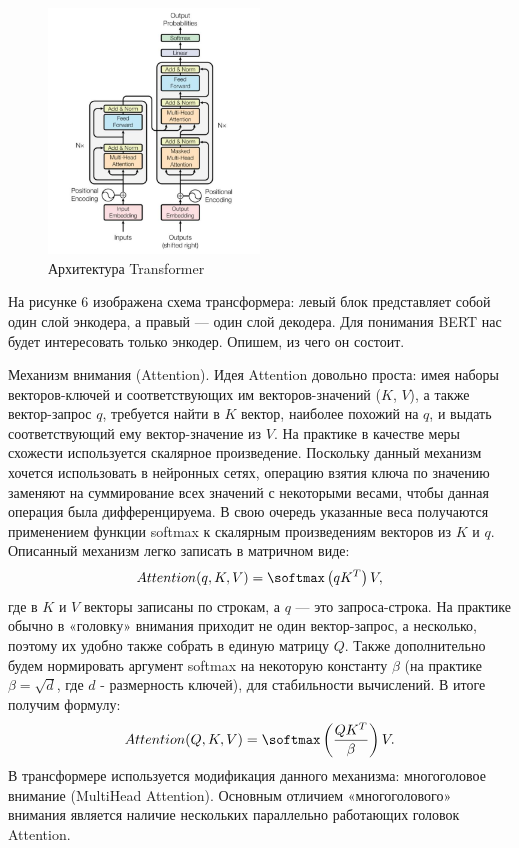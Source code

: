 \documentclass[12pt,a4paper]{article}
\begin{document}
\begin{figure}[H]
\begin{center}
  \includegraphics[width=0.5\textwidth]{transformer.jpg}
  \caption{Архитектура Transformer}
\end{center}
\end{figure}

\noindent На рисунке 6 изображена схема трансформера: левый блок представляет собой один слой энкодера, а правый --- один слой декодера. Для понимания BERT нас будет интересовать только энкодер. Опишем, из чего он состоит.

Механизм внимания (Attention). Идея Attention довольно проста: имея наборы векторов-ключей и соответствующих им векторов-значений ($K$, $V$), а также вектор-запрос $q$, требуется найти в $K$ вектор, наиболее похожий на $q$, и выдать соответствующий ему вектор-значение из $V$. На практике в качестве меры схожести используется скалярное произведение. Поскольку данный механизм хочется использовать в нейронных сетях, операцию взятия ключа по значению заменяют на суммирование всех значений с некоторыми весами, чтобы данная операция была дифференцируема. В свою очередь указанные веса получаются применением функции softmax к скалярным произведениям векторов из $K$ и $q$. Описанный механизм легко записать в матричном виде:$$Attention(q, K, V) = \softmax \left(qK^T \right) V,$$
где в $K$ и $V$ векторы записаны по строкам, а $q$ --- это запроса-строка. На практике обычно в «головку» внимания приходит не один вектор-запрос, а несколько, поэтому их удобно также собрать в единую матрицу $Q$. Также дополнительно будем нормировать аргумент softmax на некоторую константу $\beta$ (на практике $\beta = \sqrt{d}$, где $d$ - размерность ключей), для стабильности вычислений. В итоге получим формулу:
$$Attention(Q, K, V) = \softmax \left(\frac{QK^T}{\beta} \right) V.$$
В трансформере используется модификация данного механизма: многоголовое внимание (MultiHead Attention). Основным отличием «многоголового» внимания является наличие нескольких параллельно работающих головок Attention.
\end{document}
